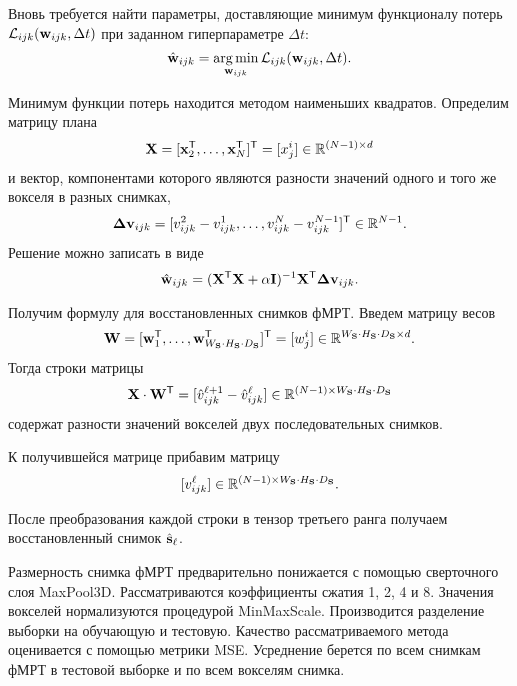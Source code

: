 \documentclass[a4paper, 12pt]{article}
\begin{document}
	Вновь требуется найти параметры, доставляющие минимум функционалу потерь $\mathcal{L}_{ijk}(\mathbf{w}_{ijk}, \Delta t)$
	при заданном гиперпараметре $\Delta t$:
	\begin{equation}
		\label{eq17}
		\hat{\mathbf{w}}_{ijk} = \operatorname*{arg\,min}_{\mathbf{w}_{ijk}} \mathcal{L}_{ijk}(\mathbf{w}_{ijk}, \Delta t).
	\end{equation}

	Минимум функции потерь находится методом наименьших квадратов. Определим матрицу плана
	\begin{equation}
		\label{eq18}
		\mathbf{X} = [\mathbf{x}_2^{\mathsf{T}}, \ldots, \mathbf{x}_N^{\mathsf{T}}]^{\mathsf{T}} = [x^i_j] \in \mathbb{R}^{(N-1) \times d}
	\end{equation}
	и вектор, компонентами которого являются разности значений одного и того же вокселя в разных снимках,
	\begin{equation}
		\label{eq19}
		\mathbf{\Delta v}_{ijk} = [v^2_{ijk} - v^1_{ijk}, \ldots, v^N_{ijk} - v^{N-1}_{ijk}]^{\mathsf{T}} \in \mathbb{R}^{N-1}.
	\end{equation}
	Решение можно записать в виде
	\begin{equation}
		\label{eq20}
		\hat{\mathbf{w}}_{ijk} = (\mathbf{X}^{\mathsf{T}} \mathbf{X} + \alpha \mathbf{I})^{-1} \mathbf{X}^{\mathsf{T}} \mathbf{\Delta v}_{ijk}.
	\end{equation}

	Получим формулу для восстановленных снимков фМРТ. Введем матрицу весов
	\begin{equation}
		\label{eq21}
		\mathbf{W} = [\mathbf{w}_1^{\mathsf{T}}, \ldots, \mathbf{w}_{W_{\mathbf{S}} \cdot H_{\mathbf{S}} \cdot D_{\mathbf{S}}}^{\mathsf{T}}]^{\mathsf{T}} = [w^i_j] \in \mathbb{R}^{W_{\mathbf{S}} \cdot H_{\mathbf{S}} \cdot D_{\mathbf{S}} \times d}.
	\end{equation}
	Тогда строки матрицы
	\begin{equation}
		\label{eq22}
		\mathbf{X} \cdot \mathbf{W}^{\mathsf{T}} = [\hat{v}^{\ell+1}_{ijk} - \hat{v}^{\ell}_{ijk}] \in \mathbb{R}^{(N-1) \times W_{\mathbf{S}} \cdot H_{\mathbf{S}} \cdot D_{\mathbf{S}}}
	\end{equation}
	содержат разности значений вокселей двух последовательных снимков. 
	
	К получившейся матрице прибавим матрицу
	\begin{equation}
		\label{eq23}
		[v^{\ell}_{ijk}] \in \mathbb{R}^{(N-1) \times W_{\mathbf{S}} \cdot H_{\mathbf{S}} \cdot D_{\mathbf{S}}}.
	\end{equation}
	
	После преобразования каждой строки в тензор третьего ранга получаем восстановленный снимок $\hat{\mathbf{s}}_{\ell}$.

	Размерность снимка фМРТ предварительно понижается с помощью сверточного слоя MaxPool3D.
	Рассматриваются коэффициенты сжатия 1, 2, 4 и 8.
	Значения вокселей нормализуются процедурой MinMaxScale.
	Производится разделение выборки на обучающую и тестовую.
	Качество рассматриваемого метода оценивается с помощью метрики MSE.
	Усреднение берется по всем снимкам фМРТ в тестовой выборке и по всем вокселям снимка.
\end{document}
